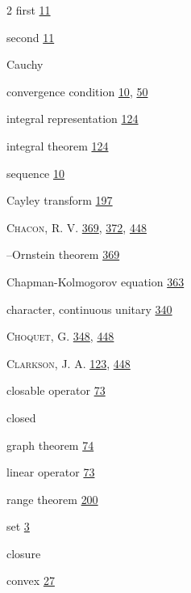 \begin{multicols}{2}
\hspace*{1.1em}first \hyperlink{page.11}{11}\par
\hspace*{1.1em}second \hyperlink{page.11}{11}\par
\noindent Cauchy\par
\hspace*{1.1em}convergence condition \hyperlink{page.10}{10}, \hyperlink{page.50}{50}\par
\hspace*{1.1em}integral representation \hyperlink{page.124}{124}\par
\hspace*{1.1em}integral theorem \hyperlink{page.124}{124}\par
\hspace*{1.1em}sequence \hyperlink{page.10}{10}\par
\noindent Cayley transform \hyperlink{page.197}{197}\par
\noindent \textsc{Chacon}, R. V. \hyperlink{page.369}{369}, \hyperlink{page.372}{372}, \hyperlink{page.448}{448}\par
\hspace*{1.1em}--Ornstein theorem \hyperlink{page.369}{369}\par
\noindent Chapman-Kolmogorov equation \hyperlink{page.363}{363}\par
\noindent character, continuous unitary \hyperlink{page.340}{340}\par
\noindent \textsc{Choquet}, G. \hyperlink{page.348}{348}, \hyperlink{page.448}{448}\par
\noindent \textsc{Clarkson}, J. A. \hyperlink{page.123}{123}, \hyperlink{page.448}{448}\par
\noindent closable operator \hyperlink{page.73}{73}\par
\noindent closed\par
\hspace*{1.1em}graph theorem \hyperlink{page.74}{74}\par
\hspace*{1.1em}linear operator \hyperlink{page.73}{73}\par
\hspace*{1.1em}range theorem \hyperlink{page.200}{200}\par
\hspace*{1.1em}set \hyperlink{page.3}{3}\par
\noindent closure\par
\hspace*{1.1em}convex \hyperlink{page.27}{27}\par

\end{multicols}

